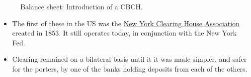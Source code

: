 \documentclass[20pt]{article}
\begin{document}
\begin{center}
\begin{figure}[H]
\begin{center}
\begin{tikzpicture}[auto, node distance=3cm,scale=(2/10),>=latex']



\end{tikzpicture}
\end{center}
\caption{Balance sheet: Introduction of a CBCH.}
\end{figure}
\end{center}

\begin{itemize}
    \item The first of these in the US was the \href{https://www.theclearinghouse.org/about-tch/a-look-back} {New York Clearing House Association} created in 1853. It still operates today, in conjunction with the New York Fed.
    \item Clearing remained on a bilateral basis until it it was made simpler, and safer for the porters, by one of the banks holding deposits from each of the others.
\end{itemize}


\end{document}
